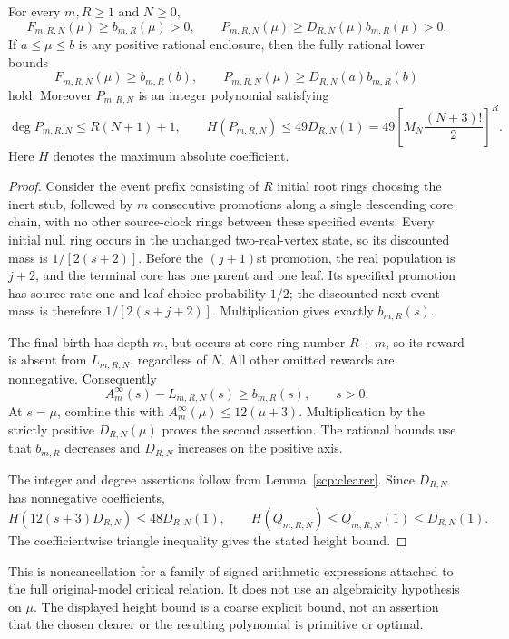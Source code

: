 \begin{theorem}\label{scp:nonvanishing}
For every $m,R\ge1$ and $N\ge0$,
\[
 F_{m,R,N}(\mu)\ge b_{m,R}(\mu)>0,
 \qquad
 P_{m,R,N}(\mu)\ge D_{R,N}(\mu)b_{m,R}(\mu)>0.
\]
If $a\le\mu\le b$ is any positive rational enclosure, then the fully
rational lower bounds
\[
 F_{m,R,N}(\mu)\ge b_{m,R}(b),\qquad
 P_{m,R,N}(\mu)\ge D_{R,N}(a)b_{m,R}(b)
\]
hold. Moreover $P_{m,R,N}$ is an integer polynomial satisfying
\[
 \deg P_{m,R,N}\le R(N+1)+1,
 \qquad
 H(P_{m,R,N})\le49D_{R,N}(1)
 =49\left[M_N\frac{(N+3)!}{2}\right]^R.
\]
Here $H$ denotes the maximum absolute coefficient.
\end{theorem}
\begin{proof}
Consider the event prefix consisting of $R$ initial root rings choosing
the inert stub, followed by $m$ consecutive promotions along a single
descending core chain, with no other source-clock rings between these
specified events. Every initial null ring occurs in the unchanged
two-real-vertex state, so its discounted mass is
$1/[2(s+2)]$. Before the $(j+1)$st promotion, the real population is
$j+2$, and the terminal core has one parent and one leaf. Its specified
promotion has source rate one and leaf-choice probability $1/2$;
the discounted next-event mass is therefore $1/[2(s+j+2)]$.
Multiplication gives exactly $b_{m,R}(s)$.

The final birth has depth $m$, but occurs at core-ring number $R+m$,
so its reward is absent from $L_{m,R,N}$, regardless of $N$. All
other omitted rewards are nonnegative. Consequently
\[
 A_m^\infty(s)-L_{m,R,N}(s)\ge b_{m,R}(s),\qquad s>0.
\]
At $s=\mu$, combine this with
$A_m^\infty(\mu)\le12(\mu+3)$. Multiplication by the strictly positive
$D_{R,N}(\mu)$ proves the second assertion. The rational bounds use
that $b_{m,R}$ decreases and $D_{R,N}$ increases on the positive axis.

The integer and degree assertions follow from Lemma~\ref{scp:clearer}.
Since $D_{R,N}$ has nonnegative coefficients,
\[
 H(12(s+3)D_{R,N})\le48D_{R,N}(1),\qquad
 H(Q_{m,R,N})\le Q_{m,R,N}(1)\le D_{R,N}(1).
\]
The coefficientwise triangle inequality gives the stated height bound.
\end{proof}

This is noncancellation for a family of signed arithmetic expressions
attached to the full original-model critical relation. It does not use
an algebraicity hypothesis on $\mu$. The displayed height bound is a
coarse explicit bound, not an assertion that the chosen clearer or the
resulting polynomial is primitive or optimal.

